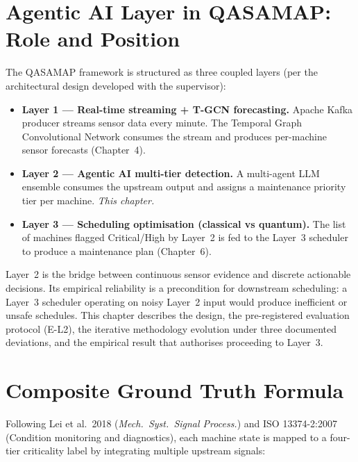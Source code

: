 %
%

\section{Agentic AI Layer in QASAMAP: Role and Position}

The QASAMAP framework is structured as three coupled layers (per the architectural design developed with the supervisor):

\begin{itemize}
    \item \textbf{Layer 1 --- Real-time streaming + T-GCN forecasting.} Apache Kafka producer streams sensor data every minute. The Temporal Graph Convolutional Network consumes the stream and produces per-machine sensor forecasts (Chapter~4).
    \item \textbf{Layer 2 --- Agentic AI multi-tier detection.} A multi-agent LLM ensemble consumes the upstream output and assigns a maintenance priority tier per machine. \emph{This chapter.}
    \item \textbf{Layer 3 --- Scheduling optimisation (classical vs quantum).} The list of machines flagged Critical/High by Layer~2 is fed to the Layer~3 scheduler to produce a maintenance plan (Chapter~6).
\end{itemize}

Layer~2 is the bridge between continuous sensor evidence and discrete actionable decisions. Its empirical reliability is a precondition for downstream scheduling: a Layer~3 scheduler operating on noisy Layer~2 input would produce inefficient or unsafe schedules. This chapter describes the design, the pre-registered evaluation protocol (E-L2), the iterative methodology evolution under three documented deviations, and the empirical result that authorises proceeding to Layer~3.

\section{Composite Ground Truth Formula}

Following Lei et al.\ 2018 (\emph{Mech.\ Syst.\ Signal Process.}) and ISO 13374-2:2007 (Condition monitoring and diagnostics), each machine state is mapped to a four-tier criticality label by integrating multiple upstream signals:

